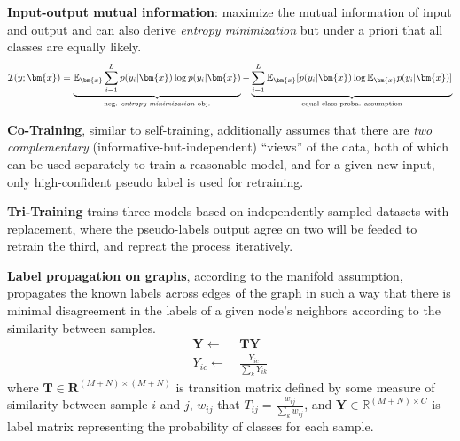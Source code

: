 \textbf{Input-output mutual information}: maximize the mutual information of input and output and can also derive \textit{entropy minimization} 
but under a priori that all classes are equally likely. 
\begin{gather}
    \mathcal{I}(y;\bm{x})=\underbrace{\mathbb{E}_{\bm{x}}\sum_{i=1}^Lp(y_i|\bm{x})\log p(y_i|\bm{x})}_\text{neg. \textit{entropy minimization} obj.}
        -\underbrace{\sum_{i=1}^L\mathbb{E}_{\bm{x}}[p(y_i|\bm{x})\log\mathbb{E}_{\bm{x}}p(y_i|\bm{x})]}_\text{equal class proba. assumption}
\end{gather}

\textbf{Co-Training}, similar to self-training, additionally assumes that there are 
\textit{two complementary} (informative-but-independent) ``views'' of the data, 
both of which can be used separately to train a reasonable model, and for a given new input, 
only high-confident pseudo label is used for retraining.

\textbf{Tri-Training} trains three models based on independently sampled datasets with replacement, 
where the pseudo-labels output agree on two will be feeded to retrain the third, and repreat the process iteratively.

\textbf{Label propagation on graphs}, according to the manifold assumption, propagates the known labels across
edges of the graph in such a way that there is minimal disagreement in the labels of a given node's neighbors
according to the similarity between samples.
\begin{align}
    \mathbf{Y}\leftarrow&~\mathbf{TY}\\
    Y_{ic}\leftarrow&~\frac{Y_{ic}}{\sum_{k}Y_{ik}}
\end{align}
where $\mathbf{T}\in\mathbf{R}^{(M+N)\times(M+N)}$ is transition matrix defined by some measure of similarity between sample $i$ and $j$, $w_{ij}$ that $T_{ij}=\frac{w_{ij}}{\sum_{k}w_{ij}}$, and
$\mathbf{Y}\in\mathbb{R}^{(M+N)\times C}$ is label matrix representing the probability of classes for each sample.

